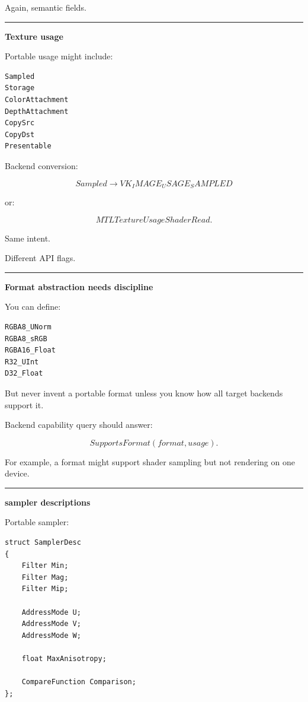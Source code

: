 Again, semantic fields.

\begin{center}\rule{0.5\linewidth}{0.5pt}\end{center}

\textbf{Texture usage}

Portable usage might include:

\begin{verbatim}
Sampled
Storage
ColorAttachment
DepthAttachment
CopySrc
CopyDst
Presentable
\end{verbatim}

Backend conversion:

\[
Sampled
\rightarrow
VK_IMAGE_USAGE_SAMPLED
\]

or:

\[
MTLTextureUsageShaderRead.
\]

Same intent.

Different API flags.

\begin{center}\rule{0.5\linewidth}{0.5pt}\end{center}

\textbf{Format abstraction needs discipline}

You can define:

\begin{verbatim}
RGBA8_UNorm
RGBA8_sRGB
RGBA16_Float
R32_UInt
D32_Float
\end{verbatim}

But never invent a portable format unless you know how all target backends support it.

Backend capability query should answer:

\[
SupportsFormat(
format,
usage).
\]

For example, a format might support shader sampling but not rendering on one device.

\begin{center}\rule{0.5\linewidth}{0.5pt}\end{center}

\textbf{sampler descriptions}

Portable sampler:

\begin{verbatim}
struct SamplerDesc
{
    Filter Min;
    Filter Mag;
    Filter Mip;

    AddressMode U;
    AddressMode V;
    AddressMode W;

    float MaxAnisotropy;

    CompareFunction Comparison;
};
\end{verbatim}

